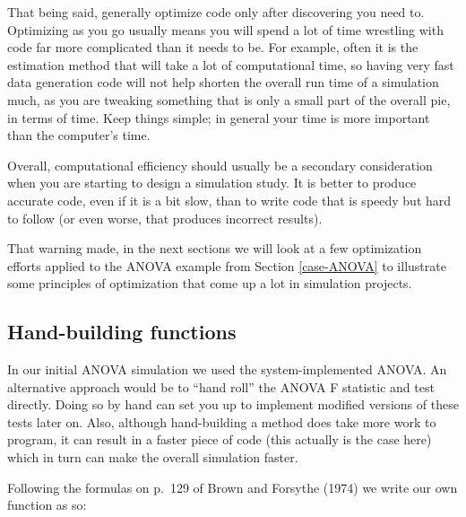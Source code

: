 \documentclass[
]{book}
\begin{document}
That being said, generally optimize code only after discovering you need to.
Optimizing as you go usually means you will spend a lot of time wrestling with code far more complicated than it needs to be.
For example, often it is the estimation method that will take a lot of computational time, so having very fast data generation code will not help shorten the overall run time of a simulation much, as you are tweaking something that is only a small part of the overall pie, in terms of time.
Keep things simple; in general your time is more important than the computer's time.

Overall, computational efficiency should usually be a secondary consideration when you are starting to design a simulation study.
It is better to produce accurate code, even if it is a bit slow, than to write code that is speedy but hard to follow (or even worse, that produces incorrect results).

That warning made, in the next sections we will look at a few optimization efforts applied to the ANOVA example from Section \ref{case-ANOVA} to illustrate some principles of optimization that come up a lot in simulation projects.

\subsection{Hand-building functions}\label{hand-building-functions}

In our initial ANOVA simulation we used the system-implemented ANOVA.
An alternative approach would be to ``hand roll'' the ANOVA F statistic and test directly.
Doing so by hand can set you up to implement modified versions of these tests later on.
Also, although hand-building a method does take more work to program, it can result in a faster piece of code (this actually is the case here) which in turn can make the overall simulation faster.

Following the formulas on p.~129 of Brown and Forsythe (1974) we write our own function as so:
\end{document}
